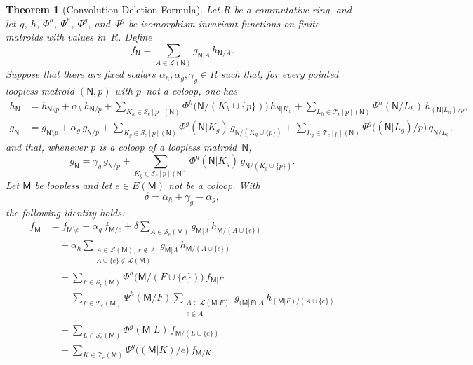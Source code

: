 \documentclass[12pt,letterpaper,english]{amsart}
\theoremstyle{teoremas}
\newtheorem{theorem}{Theorem}[section]
\theoremstyle{definition}
\newcommand{\M}{\mathsf{M}}
\newcommand{\N}{\mathsf{N}}
\newcommand{\Se}{\mathcal{S}_e}
\newcommand{\Te}{\mathcal{T}_e}
\begin{document}
\begin{theorem}[Convolution Deletion Formula]\label{thm:conv-del}
Let $R$ be a commutative ring, and let
$g$, $h$, $\Phi^h$, $\Psi^h$, $\Phi^g$, and~$\Psi^g$
be isomorphism-invariant functions on finite matroids with values in~$R$.
Define
\[
f_{\N} = \sum_{A \in \mathcal{L}(\N)} g_{\N|A}\, h_{\N/A}.
\]
Suppose that there are fixed scalars $\alpha_h, \alpha_g, \gamma_g \in R$
such that, for every pointed loopless matroid $(\N, p)$ with $p$~not a
coloop, one has
\begin{align*}
h_{\N} &= h_{\N \setminus p} + \alpha_h\, h_{\N/p}
  + \sum_{K_h \in \Se[p](\N)} \Phi^h\bigl(\N/(K_h \cup \{p\})\bigr)\, h_{\N|K_h}
  + \sum_{L_h \in \Te[p](\N)} \Psi^h(\N/L_h)\, h_{(\N|L_h)/p}, \\
g_{\N} &= g_{\N \setminus p} + \alpha_g\, g_{\N/p}
  + \sum_{K_g \in \Se[p](\N)} \Phi^g(\N|K_g)\, g_{\N/(K_g \cup \{p\})}
  + \sum_{L_g \in \Te[p](\N)} \Psi^g\bigl((\N|L_g)/p\bigr)\, g_{\N/L_g},
\end{align*}
and that, whenever $p$ is a coloop of a loopless matroid~$\N$,
\[
g_{\N} = \gamma_g\, g_{\N/p}
  + \sum_{K_g \in \Se[p](\N)} \Phi^g(\N|K_g)\, g_{\N/(K_g \cup \{p\})}.
\]
Let $\M$ be loopless and let $e \in E(\M)$ not be a coloop.
With
\[
\delta = \alpha_h + \gamma_g - \alpha_g,
\]
the following identity holds:
\begin{align*}
f_{\M} &= f_{\M \setminus e} + \alpha_g\, f_{\M/e}
  + \delta \sum_{A \in \Se(\M)} g_{\M|A}\, h_{\M/(A \cup \{e\})} \\
&\quad + \alpha_h \!\!\sum_{\substack{A \in \mathcal{L}(\M),\; e \notin A \\
    A \cup \{e\} \notin \mathcal{L}(\M)}}
  g_{\M|A}\, h_{\M/(A \cup \{e\})} \\
&\quad + \sum_{F \in \Se(\M)}
    \Phi^h\bigl(\M/(F \cup \{e\})\bigr)\, f_{\M|F} \\
&\quad + \sum_{F \in \Te(\M)} \Psi^h(\M/F)
    \sum_{\substack{A \in \mathcal{L}(\M|F) \\ e \notin A}}
    g_{(\M|F)|A}\, h_{(\M|F)/(A \cup \{e\})} \\
&\quad + \sum_{L \in \Se(\M)}
    \Phi^g(\M|L)\, f_{\M/(L \cup \{e\})} \\
&\quad + \sum_{K \in \Te(\M)}
    \Psi^g\bigl((\M|K)/e\bigr)\, f_{\M/K}.
\end{align*}
\end{theorem}
\end{document}

